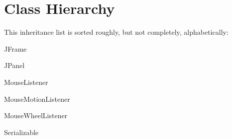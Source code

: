 \section{Class Hierarchy}
This inheritance list is sorted roughly, but not completely, alphabetically\+:\begin{DoxyCompactList}
\item J\+Frame\begin{DoxyCompactList}
\item {}
\end{DoxyCompactList}
\item J\+Panel\begin{DoxyCompactList}
\item {}
\end{DoxyCompactList}
\item {}
\item Mouse\+Listener\begin{DoxyCompactList}
\item {}
\end{DoxyCompactList}
\item Mouse\+Motion\+Listener\begin{DoxyCompactList}
\item {}
\end{DoxyCompactList}
\item Mouse\+Wheel\+Listener\begin{DoxyCompactList}
\item {}
\end{DoxyCompactList}
\item Serializable\begin{DoxyCompactList}
\item {}
\begin{DoxyCompactList}
\item {}
\item {}
\item {}
\item {}
\end{DoxyCompactList}
\end{DoxyCompactList}
\end{DoxyCompactList}
